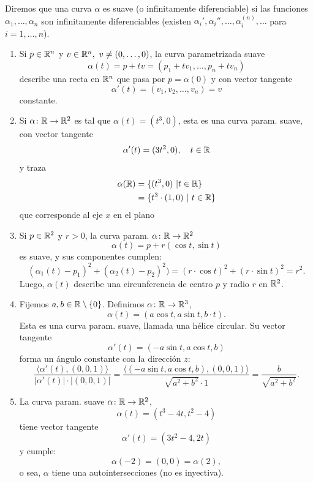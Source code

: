 \begin{definition}
	Diremos que una curva $\alpha$ es suave (o infinitamente diferenciable) si las funciones $\alpha_{1}, \dots, \alpha_{n}$ son infinitamente diferenciables (existen $\alpha_{i}', \alpha_{i}'', \dots, \alpha_{i}^{(n)}, \dots$ para $i = 1, \dots, n$).
\end{definition}

\begin{eg}
	\begin{enumerate}
		\item Si $p \in \mathbb{R}^{n}$ y $v \in \mathbb{R}^{n},\ v \neq (0, \dots, 0)$, la curva parametrizada suave
		\[ \alpha(t) = p + tv = (p_{1} + tv_{1}, \dots, p_{n} + tv_{n}) \]
		describe una recta en $\mathbb{R}^{n}$ que pasa por $p = \alpha(0)$ y con vector tangente
		\[ \alpha'(t) = (v_{1}, v_{2}, \dots, v_{n}) = v \]
		constante.

		\item Si $\alpha \colon \mathbb{R} \to \mathbb{R}^{2}$ es tal que $\alpha(t) = (t^{3}, 0)$, esta es una curva param. suave, con vector tangente
		\[ \alpha'(t) = (3t^{2}, 0), \quad t \in \mathbb{R} \]
		y traza
		\begin{align*}
			\alpha(\mathbb{R}) &= \{ (t^{3}, 0) \ | t \in \mathbb{R} \} \\
			&= \{ t^{3} \cdot (1,0) \ | \ t \in \mathbb{R} \}  
		\end{align*}
		que corresponde al eje $x$ en el plano

		\item Si $p \in \mathbb{R}^{2}$ y $r > 0$, la curva param. $\alpha \colon \mathbb{R} \to \mathbb{R}^{2}$
		\[ \alpha(t) = p + r(\cos t, \sin t) \]
		es suave, y sus componentes cumplen:
		\[ (\alpha_{1}(t) - p_{1})^{2} + (\alpha_{2}(t) - p_{2})^{2}) = (r \cdot \cos t)^{2} + (r \cdot \sin t)^{2} = r^{2}. \]
		Luego, $\alpha(t)$ describe una circunferencia de centro $p$ y radio $r$ en $\mathbb{R}^{2}$.

		\item Fijemos $a,b \in \mathbb{R} \setminus \{ 0 \}$. Definimos $\alpha \colon \mathbb{R} \to \mathbb{R}^{3}$,
		\[ \alpha(t) = (a \cos t, a \sin t, b \cdot t). \]
		Esta es una curva param. suave, llamada una hélice circular. Su vector tangente
		\[ \alpha'(t) = (-a \sin t, a \cos t, b) \]
		forma un ángulo constante con la dirección $z$:
		\[ \frac{\langle \alpha'(t), (0,0,1) \rangle}{| \alpha'(t) | \cdot |(0,0,1)|} = \frac{\langle (-a \sin t, a \cos t, b), (0,0,1) \rangle}{\sqrt{a^{2} + b^{2}} \cdot 1} = \frac{b}{\sqrt{a^{2} + b^{2}}}. \]

		\item La curva param. suave $\alpha \colon \mathbb{R} \to \mathbb{R}^{2}$,
		\[ \alpha(t) = (t^{3} - 4t, t^{2} - 4) \]
		tiene vector tangente
		\[ \alpha'(t) = (3t^{2} - 4, 2t) \]
		y cumple:
		\[ \alpha(-2) = (0,0) = \alpha(2), \]
		o sea, $\alpha$ tiene una autointersecciones (no es inyectiva).
	\end{enumerate}
\end{eg}

